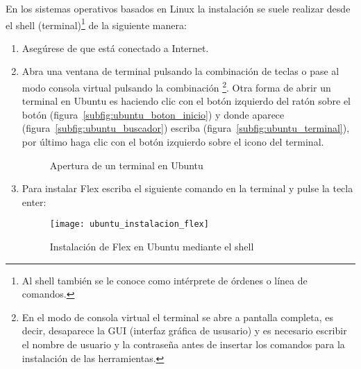 	En los sistemas operativos basados en Linux la instalación se suele realizar desde el shell (terminal)\footnote
	{
		Al shell también se le conoce como intérprete de órdenes o línea de comandos.
	}
	de la siguiente manera:
	\begin{enumerate}
		\item Asegúrese de que está conectado a Internet.

		\item Abra una ventana de terminal pulsando la combinación de teclas  o pase al modo consola virtual pulsando la combinación \footnote
		{
			En el modo de consola virtual el terminal se abre a pantalla completa, es decir, desaparece la GUI (interfaz gráfica de ususario) y es necesario escribir el nombre de usuario y la contraseña antes de insertar los comandos para la instalación de las herramientas.
		}.
		Otra forma de abrir un terminal en Ubuntu es haciendo clic con el botón izquierdo del ratón sobre el botón  (figura~\ref{subfig:ubuntu_boton_inicio}) y donde aparece  (figura~\ref{subfig:ubuntu_buscador}) escriba  (figura~\ref{subfig:ubuntu_terminal}), por último haga clic con el botón izquierdo sobre el icono del terminal.
		\begin{figure}[!ht]
    		\hfill
      	\hfill\centering
      	\caption{Apertura de un terminal en Ubuntu}
    		\label{fig:apertura_terminal_ubuntu}
    	\end{figure}

		\item Para instalar Flex escriba el siguiente comando en la terminal y pulse la tecla enter:


		\begin{figure}[!ht]
			\centering
			\texttt{[image: ubuntu\_instalacion\_flex]}
			\caption{Instalación de Flex en Ubuntu mediante el shell}
			\label{fig:ubuntu_instalacion_flex}
		\end{figure}


\end{enumerate}
